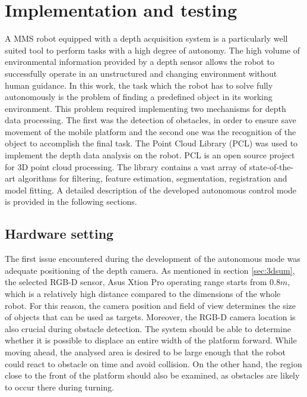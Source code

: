 \chapter{Implementation and testing}
\label{cha:implandtest}

A MMS robot equipped with a depth acquisition system is a particularly well suited tool to perform tasks with a high degree of autonomy. The high volume of environmental information provided by a depth sensor allows the robot to successfully operate in an unstructured and changing environment without human guidance. In this work, the task which the robot has to solve fully autonomously is the problem of finding a predefined object in its working environment. This problem required implementing two mechanisms for depth data processing. The first was the detection of obstacles, in order to ensure save movement of the mobile platform and the second one was the recognition of the object to accomplish the final task. The Point Cloud Library (PCL) \cite{Rusu_ICRA2011_PCL} was used to implement the depth data analysis on the robot. PCL is an open source project for 3D point cloud processing. The library contains a vast array of state-of-the-art algorithms for filtering, feature estimation, segmentation, registration and model fitting. A detailed description of the developed autonomous control mode is provided in the following sections.


\section{Hardware setting}
\label{sec:setting}

The first issue encountered during the development of the autonomous mode was adequate positioning of the depth camera. As mentioned in section \ref{sec:3dsum}, the selected RGB-D sensor, Asus Xtion Pro operating range starts from $0.8m$, which is a relatively high distance compared to the dimensions of the whole robot. For this reason, the camera position and field of view determines the size of objects that can be used as targets. 	Moreover, the RGB-D camera location is also crucial during obstacle detection. The system should be able to determine whether it is possible to displace an entire width of the platform forward. While moving ahead, the analysed area is desired to be large enough that the robot could react to obstacle on time and avoid collision. On the other hand, the region close to the front of the platform should also be examined, as obstacles are likely to occur there during turning.

